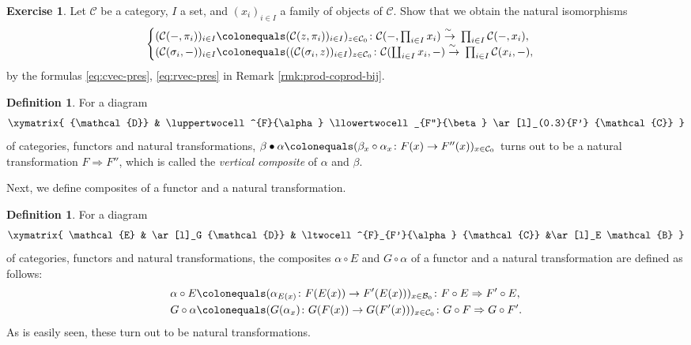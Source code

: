 \documentclass{surv-l}
\numberwithin{equation}{chapter}
\numberwithin{figure}{chapter}
\theoremstyle{plain}
\theoremstyle{definition}
\newtheorem{dfn}[thm]{Definition}
\newtheorem{exc}[thm]{Exercise}
\theoremstyle{remark}
\newcommand{\isoto}{\
  \raise.8ex\hbox{$^{\sim}$}\kern-.7em\hbox{$\to$}\ }
\DeclareMathOperator{\blank}{-}
\begin{document}
\begin{exc}\label{exc:Hom-prod-coprod-natiso}
Let ${\mathcal{C}}$ be a category, $I$ a set, and $(x_i)_{i\in I}$ a family of objects of ${\mathcal{C}}$.
Show that we obtain the natural isomorphisms
\begin{equation}\label{eq:Hom-prod-coprod-natiso}
\begin{cases}
({\mathcal{C}}(\blank, \pi_i))_{i\in I}\colonequals ({\mathcal{C}}(z, \pi_i))_{i\in I})_{z \in {\mathcal{C}}_0}\colon
{\mathcal{C}}(\blank, \prod_{i\in I}x_i) \isoto \prod_{i\in I}{\mathcal{C}}(\blank, x_i),\\
({\mathcal{C}}(\sigma_i, \blank))_{i\in I}\colonequals (({\mathcal{C}}(\sigma_i, z))_{i\in I})_{z\in {\mathcal{C}}_0}\colon
{\mathcal{C}}(\coprod_{i\in I}x_i, \blank) \isoto \prod_{i\in I}{\mathcal{C}}(x_i, \blank),
\end{cases}
\end{equation}
by the formulas \eqref{eq:cvec-pres}, \eqref{eq:rvec-pres} in Remark \ref{rmk:prod-coprod-bij}.
\end{exc}

\begin{dfn}\label{dfn:vert-comp}
For a diagram
\[
\xymatrix{
{\mathcal{D}}
& \luppertwocell^{F}{\alpha}
\llowertwocell_{F''}{\beta}
\ar[l]_(0.3){F'}
{\mathcal{C}}
}
\]
of categories, functors and natural transformations,
$\beta \bullet \alpha\colonequals  (\beta_x \circ \alpha_x \colon F(x) \to F''(x))_{x \in {\mathcal{C}}_0}$
turns out to be a natural transformation $F \Rightarrow F''$,
which is called the \emph{vertical composite} of $\alpha$ and $\beta$.
\end{dfn}

Next, we define composites of a functor and a natural transformation.

\begin{dfn}\label{dfn:func-nat-comp}
For a diagram
\[
\xymatrix{
\mathcal{E} & \ar[l]_G {\mathcal{D}} & \ltwocell^{F}_{F'}{\alpha} {\mathcal{C}} &\ar[l]_E \mathcal{B}
}
\]
of categories, functors and natural transformations,
the composites $\alpha \circ E$ and $G \circ \alpha$ of a functor and a natural transformation
are defined as follows:
\[
\begin{aligned}
\alpha \circ E&\colonequals  (\alpha_{E(x)} \colon F(E(x)) \to F'(E(x)))_{x \in \mathcal{B}_0} \colon F\circ E \Rightarrow F' \circ E,\\
G \circ \alpha&\colonequals  (G(\alpha_x) \colon G(F(x)) \to G(F'(x)))_{x \in {\mathcal{C}}_0} \colon G \circ F \Rightarrow G \circ F'.
\end{aligned}
\]
As is easily seen, these turn out to be natural transformations.
\end{dfn}
\end{document}
